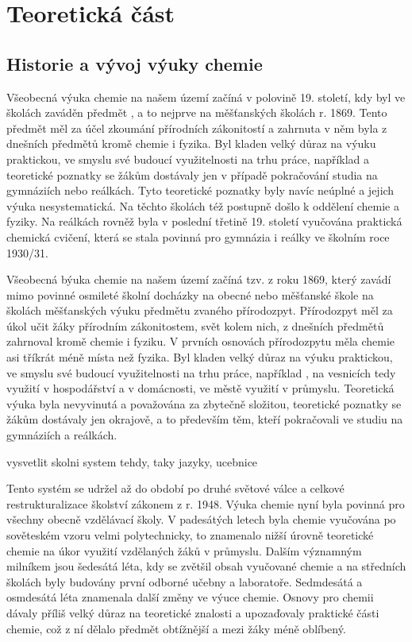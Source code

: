 \chapter{Teoretická část}

\section{Historie a vývoj výuky chemie}
Všeobecná výuka chemie na našem území začíná v polovině 19. století, kdy byl ve školách zaváděn předmět , a to nejprve na měšťanských školách r. 1869. Tento předmět měl za účel zkoumání přírodních zákonitostí a zahrnuta v něm byla z dnešních předmětů kromě chemie i fyzika. Byl kladen velký důraz na výuku praktickou, ve smyslu své budoucí využitelnosti na trhu práce, například \cite{prirodozpyt} a teoretické poznatky se žákům dostávaly jen v případě pokračování studia na gymnáziích nebo reálkách. Tyto teoretické poznatky byly navíc neúplné a jejich výuka nesystematická. Na těchto školách též postupně došlo k oddělení chemie a fyziky. Na reálkách rovněž byla v poslední třetině 19. století vyučována praktická chemická cvičení, která se stala povinná pro gymnázia i reálky ve školním roce 1930/31.\cite{historie_vyuky}

Všeobecná býuka chemie na našem území začíná tzv.  z roku 1869, který zavádí mimo povinné osmileté školní docházky na obecné nebo měšťanské škole na školách měšťanských výuku předmětu zvaného přírodozpyt. Přírodozpyt měl za úkol učit žáky přírodním zákonitostem,  svět kolem nich, z dnešních předmětů zahrnoval kromě chemie i fyziku. V prvních osnovách přírodozpytu měla chemie asi tříkrát méně místa než fyzika. Byl kladen velký důraz na výuku praktickou, ve smyslu své budoucí využitelnosti na trhu práce, například , na vesnicích tedy využití v hospodářství a v domácnosti, ve městě využití v průmyslu.\cite{prirodozpyt} Teoretická výuka byla nevyvinutá a považována za zbytečně složitou, teoretické poznatky se žákům dostávaly jen okrajově, a to především těm, kteří pokračovali ve studiu na gymnáziích a reálkách. 

vysvetlit skolni system tehdy, taky jazyky, ucebnice

Tento systém se udržel až do období po druhé světové válce a celkové restrukturalizace školství zákonem z r. 1948. Výuka chemie nyní byla povinná pro všechny obecně vzdělávací školy. V padesátých letech byla chemie vyučována po sověteském vzoru velmi polytechnicky, to znamenalo nižší úrovně teoretické chemie na úkor využití vzdělaných žáků v průmyslu. Dalším významným milníkem jsou šedesátá léta, kdy se zvětšil obsah vyučované chemie a na středních školách byly budovány první odborné učebny a laboratoře. Sedmdesátá a osmdesátá léta znamenala další změny ve výuce chemie. Osnovy pro chemii dávaly příliš velký důraz na teoretické znalosti a upozaďovaly praktické části chemie, což z ní dělalo předmět obtížnější a mezi žáky méně oblíbený.\cite{historie_vyuky}\cite{u_nas_v_zahranici}

